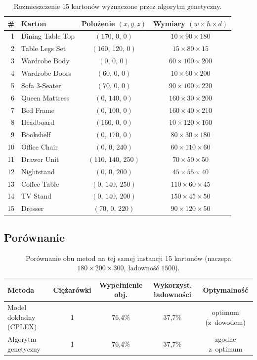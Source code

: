 \documentclass[12pt]{article}
\begin{document}
\begin{table}[H]
\centering
\begin{tabular}{rlcc}
\toprule
\# & Karton & Położenie $(x,y,z)$ & Wymiary $(w\times h\times d)$ \\
\midrule
1  & Dining Table Top & $(170,\,0,\,0)$     & $10\times90\times180$  \\
2  & Table Legs Set   & $(160,\,120,\,0)$   & $15\times80\times15$   \\
3  & Wardrobe Body    & $(0,\,0,\,0)$       & $60\times100\times200$ \\
4  & Wardrobe Doors   & $(60,\,0,\,0)$      & $10\times60\times200$  \\
5  & Sofa 3-Seater    & $(70,\,0,\,0)$      & $90\times100\times220$ \\
6  & Queen Mattress   & $(0,\,140,\,0)$     & $160\times30\times200$ \\
7  & Bed Frame        & $(0,\,100,\,0)$     & $160\times40\times210$ \\
8  & Headboard        & $(160,\,0,\,0)$     & $10\times120\times160$ \\
9  & Bookshelf        & $(0,\,170,\,0)$     & $80\times30\times180$  \\
10 & Office Chair     & $(0,\,0,\,240)$     & $60\times110\times60$  \\
11 & Drawer Unit      & $(110,\,140,\,250)$ & $70\times50\times50$   \\
12 & Nightstand       & $(0,\,0,\,200)$     & $45\times55\times40$   \\
13 & Coffee Table     & $(0,\,140,\,250)$   & $110\times60\times45$  \\
14 & TV Stand         & $(0,\,140,\,200)$   & $150\times45\times50$  \\
15 & Dresser          & $(70,\,0,\,220)$    & $90\times120\times50$  \\
\bottomrule
\end{tabular}
\caption{Rozmieszczenie 15 kartonów wyznaczone przez algorytm genetyczny.}
\end{table}

\subsection{Porównanie}

\begin{table}[H]
\centering
\begin{tabular}{lcccc}
\toprule
Metoda & Ciężarówki & Wypełnienie obj. & Wykorzyst. ładowności & Optymalność \\
\midrule
Model dokładny (CPLEX) & 1 & 76,4\% & 37,7\% & optimum (z~dowodem) \\
Algorytm genetyczny    & 1 & 76,4\% & 37,7\% & zgodne z~optimum \\
\bottomrule
\end{tabular}
\caption{Porównanie obu metod na tej samej instancji 15 kartonów (naczepa $180\times200\times300$, ładowność $1500$).}
\end{table}
\end{document}
